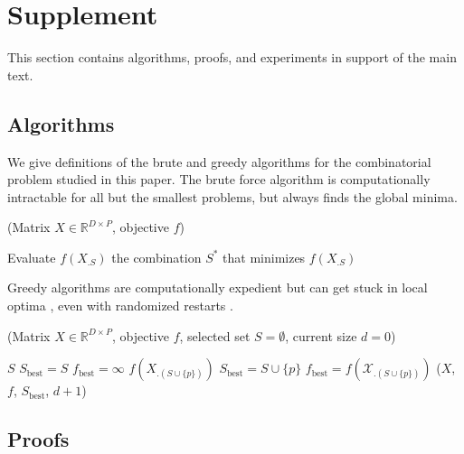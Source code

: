 \section{Supplement}

This section contains algorithms, proofs, and experiments in support of the main text.

\subsection{Algorithms}
\label{sec:algorithms}

We give definitions of the brute and greedy algorithms for the combinatorial problem studied in this paper.
The brute force algorithm is computationally intractable for all but the smallest problems, but always finds the global minima.

\begin{algorithm}[H]
\caption{\brute(Matrix ${X} \in \mathbb{R}^{D \times P}$, objective $f$)}
\begin{algorithmic}[1]
    \STATE Evaluate $f({X}_{.S})$
\ENDFOR
{} the combination $S^*$ that minimizes $f({X}_{.S})$
\end{algorithmic}
\end{algorithm}

Greedy algorithms are computationally expedient but can get stuck in local optima \citep{Cormen, Russell-09}, even with randomized restarts \citep{Dick2014HowMR}.

\begin{algorithm}[H]
\caption{\greedy(Matrix ${X} \in \mathbb{R}^{D \times P}$, objective $f$, selected set $S = \emptyset$, current size $d=0$)}
\begin{algorithmic}[1]
     $S$
\ELSE
     $S_{\text{best}} = S$
     $f_{\text{best}} = \infty$
         $f({X}_{.(S \cup \{p\})})$
             $S_{\text{best}} = S \cup \{p\}$
             $f_{\text{best}} = f(\mathcal{X}_{.(S \cup \{p\})})$
        \ENDIF
    \ENDFOR
     \greedy(${X}$, $f$, $S_{\text{best}}$, $d+1$)
\ENDIF
\end{algorithmic}
\end{algorithm}

\subsection{Proofs}
\label{sec:proofs}

